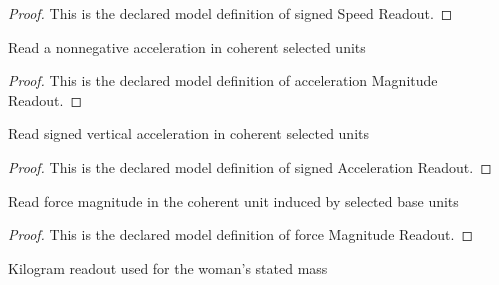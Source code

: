 \begin{proof}
  This is the declared model definition of signed Speed Readout.
\end{proof}
\begin{definition}
  \label{def:physics:phyx-mini-0803:phyxminiproblems-problemphyxmini0803-accelerationmagnitudereadout}
  Read a nonnegative acceleration in coherent selected units
\end{definition}
\begin{proof}
  This is the declared model definition of acceleration Magnitude Readout.
\end{proof}
\begin{definition}
  \label{def:physics:phyx-mini-0803:phyxminiproblems-problemphyxmini0803-signedaccelerationreadout}
  Read signed vertical acceleration in coherent selected units
\end{definition}
\begin{proof}
  This is the declared model definition of signed Acceleration Readout.
\end{proof}
\begin{definition}
  \label{def:physics:phyx-mini-0803:phyxminiproblems-problemphyxmini0803-forcemagnitudereadout}
  Read force magnitude in the coherent unit induced by selected base units
\end{definition}
\begin{proof}
  This is the declared model definition of force Magnitude Readout.
\end{proof}
\begin{definition}
  \label{def:physics:phyx-mini-0803:phyxminiproblems-problemphyxmini0803-massinkilograms}
  Kilogram readout used for the woman's stated mass
\end{definition}
